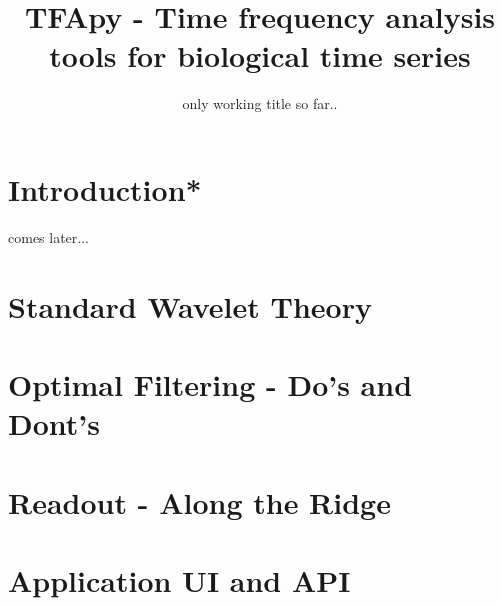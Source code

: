 \documentclass[notitlepage]{scrartcl}
\begin{document}
\title{TFApy - Time frequency analysis tools for biological time series}
\subtitle{only working title so far..}

\maketitle
\section{Introduction*}

comes later...

\section{Standard Wavelet Theory}

\section{Optimal Filtering - Do's and Dont's}

\section{Readout - Along the Ridge}

\section{Application UI and API}
\end{document}
